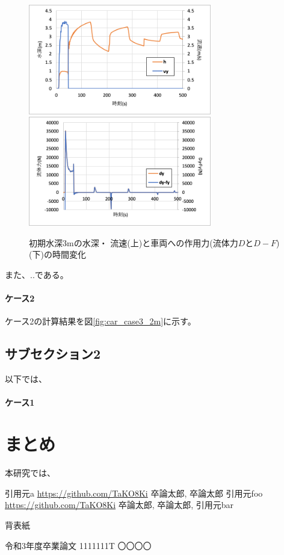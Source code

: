 \documentclass[12pt]{jsarticle}
\begin{document}
  \begin{figure}[H]
    \begin{center}
      \includegraphics[width=8cm]{images/vy_h.png}
      \includegraphics[width=8cm]{images/dy_dy_fy.png}
    \end{center}
    \caption{初期水深3mの水深・
    流速(上)と車両への作用力(流体力\(D\)と\(D-F\)) (下)の時間変化}
    \label{fig:car_case1_3m_force}
  \end{figure}

  \noindent
  また、..である。

  \paragraph{ケース2}

  ケース2の計算結果を図\ref{fig:car_case3_2m}に示す。

  \subsection{サブセクション2}

  以下では、

  \paragraph{ケース1}

  \section{まとめ}

  本研究では、

  \begin{thebibliography}{99}
   引用元a \url{https://github.com/TaKO8Ki}
   卒論太郎, 卒論太郎 引用元foo \url{https://github.com/TaKO8Ki}
   卒論太郎, 卒論太郎, 引用元bar
  \end{thebibliography}

  \clearpage

  背表紙
  
  令和3年度卒業論文 1111111T 〇〇〇〇
\end{document}
